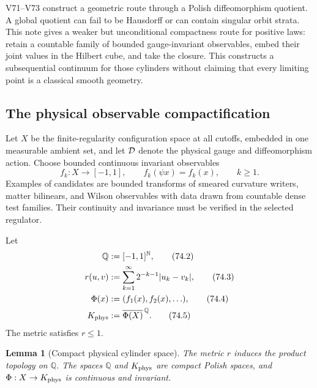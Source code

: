 \documentclass[11pt]{article}
\newtheorem{lemma}[theorem]{Lemma}
\theoremstyle{remark}
\begin{document}
V71--V73 construct a geometric route through a Polish
diffeomorphism quotient.  A global quotient can fail to be Hausdorff
or can contain singular orbit strata.  This note gives a weaker but
unconditional compactness route for positive laws: retain a
countable family of bounded gauge-invariant observables, embed their
joint values in the Hilbert cube, and take the closure.  This
constructs a subsequential continuum for those cylinders without
claiming that every limiting point is a classical smooth geometry.

\subsection{The physical observable compactification}

Let \(X\) be the finite-regularity configuration space at all
cutoffs, embedded in one measurable ambient set, and let
\({\cal D}\) denote the physical gauge and diffeomorphism action.
Choose bounded continuous invariant observables
\[
 f_k:X\longrightarrow[-1,1],\qquad
 f_k(\psi x)=f_k(x),\qquad k\geq1.                            \tag{74.1}
\]
Examples of candidates are bounded transforms of smeared curvature
writers, matter bilinears, and Wilson observables with data drawn
from countable dense test families.  Their continuity and invariance
must be verified in the selected regulator.

Let
\begin{align}
 {\mathbb Q}&:=[-1,1]^{\mathbb N},                           \tag{74.2}\\
 r(u,v)&:=\sum_{k=1}^{\infty}2^{-k-1}|u_k-v_k|,              \tag{74.3}\\
 \Phi(x)&:=(f_1(x),f_2(x),\ldots),                           \tag{74.4}\\
 K_{\rm phys}&:=\overline{\Phi(X)}^{\,{\mathbb Q}}.          \tag{74.5}
\end{align}
The metric satisfies \(r\leq1\).

\begin{lemma}[Compact physical cylinder space]
\label{lem:v12v74-compact}
The metric \(r\) induces the product topology on \(\mathbb Q\).
The spaces \(\mathbb Q\) and \(K_{\rm phys}\) are compact Polish
spaces, and \(\Phi:X\to K_{\rm phys}\) is continuous and invariant.
\end{lemma}
\end{document}
